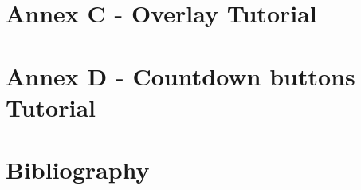 \documentclass{article}
\begin{document}
\section{Annex C - Overlay Tutorial}


\section{Annex D - Countdown buttons Tutorial}





\section{Bibliography}
		
	
\end{document}
